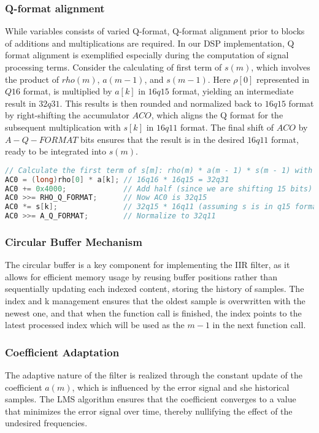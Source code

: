 \subsubsection{Q-format alignment} 
While variables consists of varied Q-format, Q-format alignment prior to blocks of additions and multiplications are required. In our DSP implementation, Q format alignment is exemplified especially during the computation of signal processing terms. Consider the calculating of first term of $s(m)$, which involves the product of $rho(m)$, $a(m-1)$, and $s(m-1)$. Here $\rho[0]$ represented in $Q16$ format, is multiplied by $a[k]$ in $16q15$ format, yielding an intermediate result in $32q31$. This results is then rounded and normalized back to $16q15$ format by right-shifting the accumulator $ACO$, which aligns the Q format for the subsequent multiplication with $s[k]$ in $16q11$ format. The final shift of $ACO$ by $A-Q-FORMAT$ bits ensures that the result is in the desired $16q11$ format, ready to be integrated into $s(m)$.

\begin{lstlisting}[language=C, basicstyle=\small]
// Calculate the first term of s[m]: rho(m) * a(m - 1) * s(m - 1) with k = (m - 1)
AC0 = (long)rho[0] * a[k]; // 16q16 * 16q15 = 32q31
AC0 += 0x4000;             // Add half (since we are shifting 15 bits) to round
AC0 >>= RHO_Q_FORMAT;      // Now AC0 is 32q15
AC0 *= s[k];               // 32q15 * 16q11 (assuming s is in q15 format) = 32q26
AC0 >>= A_Q_FORMAT;        // Normalize to 32q11
\end{lstlisting}

\subsubsection{Circular Buffer Mechanism}
The circular buffer is a key component for implementing the IIR filter, as it allows for efficient memory usage by reusing buffer positions rather than sequentially updating each indexed content, storing the history of samples. The index and k management ensures that the oldest sample is overwritten with the newest one, and that when the function call is finished, the index points to the latest processed index which will be used as the $m-1$ in the next function call.

\subsubsection{Coefficient Adaptation}
The adaptive nature of the filter is realized through the constant update of the coefficient $a(m)$, which is influenced by the error signal and she historical samples. The LMS algorithm ensures that the coefficient converges to a value that minimizes the error signal over time, thereby nullifying the effect of the undesired frequencies.

